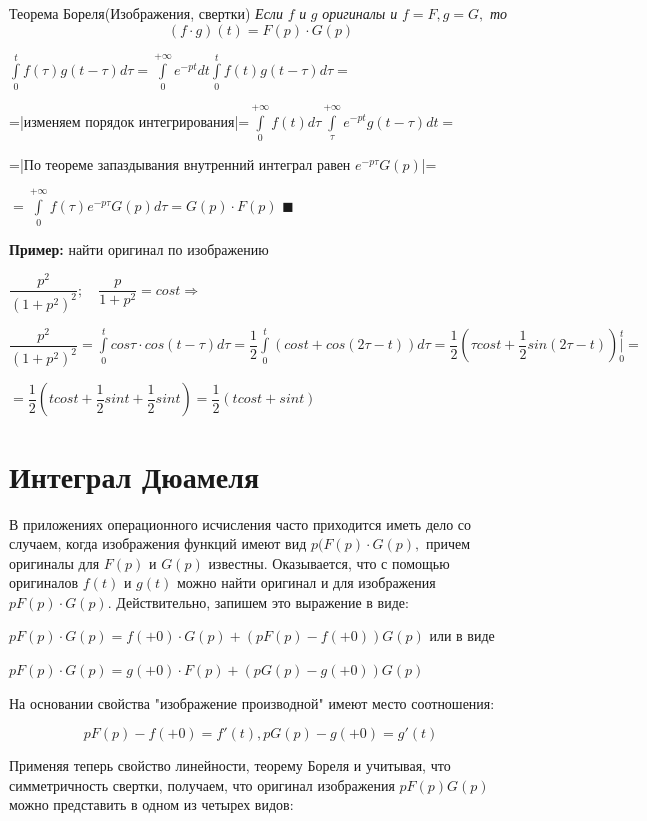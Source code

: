 \documentclass[a4paper, 12pt]{report}
\newenvironment{Proof}
{\par\noindent{\bf Доказательство.}}
{\hfill$\scriptstyle\blacksquare$}
\begin{document}
\par\bigskip
$\textbf{Теорема Бореля}$(Изображения, свертки)
\textit{Если} $f$ \textit{и} $g$ \textit{оригиналы и }$f=F, g=G,$ \textit{то} $$(f\cdot g)(t)=F(p)\cdot G(p)$$


\begin{Proof}
    $\int\limits_{0}^{t}f(\tau)g(t-\tau)d\tau=\int\limits_{0}^{+\infty}e^{-pt}dt\int\limits_{0}^{t}f(t)g(t-\tau)d\tau=$

=|изменяем порядок интегрирования|=$\int\limits_{0}^{+\infty}f(t)d\tau \int\limits_{\tau}^{+\infty}e^{-pt}g(t-\tau) dt =$

=|По теореме запаздывания внутренний интеграл равен $e^{-p\tau}G(p)$|=

$=\int\limits_{0}^{+\infty}f(\tau)e^{-p\tau}G(p)d\tau= G(p)\cdot F(p)$
\end{Proof}
\par\bigskip

\textbf{Пример:} найти оригинал по изображению

$\dfrac{p^2}{(1+p^2)^2};\quad \dfrac{p}{1+p^2} = cost\Rightarrow$

$\dfrac{p^2}{(1+p^2)^2}= \int\limits_{0}^{t}cos\tau\cdot cos(t-\tau)d\tau= \dfrac{1}{2}\int\limits_{0}^{t}(cost+cos(2\tau-t))d\tau=\dfrac{1}{2}(\tau cost+\dfrac{1}{2}sin(2\tau-t))\bigg|\limits_0^t=$

$=\dfrac{1}{2}(tcost+\dfrac{1}{2}sint+\dfrac{1}{2}sint)=\dfrac{1}{2}(tcost+sint)$

\section{Интеграл Дюамеля}
В приложениях операционного исчисления часто приходится иметь дело со случаем, когда изображения функций имеют вид $p(F(p)\cdot G(p),$ причем оригиналы для $F(p)$ и $G(p)$ известны. Оказывается, что с помощью оригиналов $f(t)$ и $g(t)$ можно найти оригинал и для изображения $pF(p)\cdot G(p)$. Действительно, запишем это выражение в виде:
\par\bigskip

$pF(p)\cdot G(p)= f(+0)\cdot G(p)+(pF(p)-f(+0))G(p)$ или в виде

$pF(p)\cdot G(p)= g(+0)\cdot F(p)+(pG(p)-g(+0))G(p)$
\par\bigskip
На основании свойства "изображение производной" имеют место соотношения:

$$pF(p)-f(+0)=f'(t), pG(p)-g(+0)=g'(t)$$
\par Применяя теперь свойство линейности, теорему Бореля и учитывая, что симметричность свертки, получаем, что оригинал изображения $pF(p)G(p)$ можно представить в одном из четырех видов:
\end{document}
